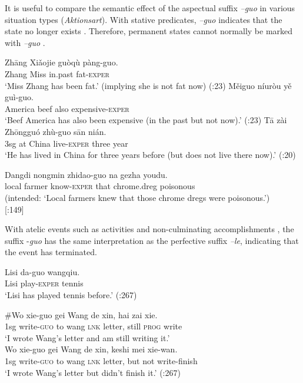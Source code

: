 It is useful to compare the semantic effect of the aspectual suffix \textit{–guo} in various situation types (\textit{Aktionsart}). With stative predicates, \textit{–guo} indicates that the state no longer exists . Therefore, permanent states cannot normally be marked with \textit{–guo} .


\ea
\ea \gll  Zh\=ang  Xiǎojie  guòqù  pàng-guo.\\
Zhang  Miss  in.past  fat-\textsc{exper}\\
\glt ‘Miss Zhang has been fat.’ (implying she is not fat now)  (\citealt{Ma1977}:23)
\ex \gll Měiguo  níuròu  yě  guì-guo.\\
America  beef  also  expensive-\textsc{exper}\\
\glt ‘Beef America has also been expensive (in the past but not now).’  (\citealt{Ma1977}:23)
\ex \gll  T\=a  zài  Zh\=ongguó  zhù-guo  s\=an  nián.\\
3sg  at  China  live-\textsc{exper} three  year\\
\glt ‘He has lived in China for three years before (but does not live there now).’  (\citealt{Ma1977}:20)
\z \z

\ea
\gll *Dangdi  nongmin  zhidao-guo  na  gezha  youdu.\\
  local  farmer  know-\textsc{exper}  that  chrome.dreg  poisonous\\
\glt (intended: ‘Local farmers knew that those chrome dregs were poisonous.’)\\
   {}[\citealt{XiaoMcEnery2004}:149]
\z


With atelic events such as activities  and non-culminating accomplishments , the suffix -\textit{guo} has the same interpretation as the perfective suffix \textit{–le}, indicating that the event has terminated.


\ea
\gll Lisi  da-guo  wangqiu.\\
Lisi  play-\textsc{exper}  tennis\\
\glt ‘Lisi has played tennis before.’  (\citealt{Smith1997}:267)
\z

\ea
\ea \gll \#Wo  xie-guo  gei  Wang  de  xin,  hai  zai  xie.\\
 1sg  write-\textsc{guo}  to  wang  \textsc{lnk} letter,  still  \textsc{prog}  write\\
\glt ‘I wrote Wang’s letter and am still writing it.’\\
\ex \gll  Wo  xie-guo  gei  Wang  de  xin,  keshi  mei  xie-wan.\\
1sg  write-\textsc{guo}  to  wang  \textsc{lnk} letter,  but  not  write-finish\\
\glt ‘I wrote Wang’s letter but didn’t finish it.’  (\citealt{Smith1997}:267)
\z \z


